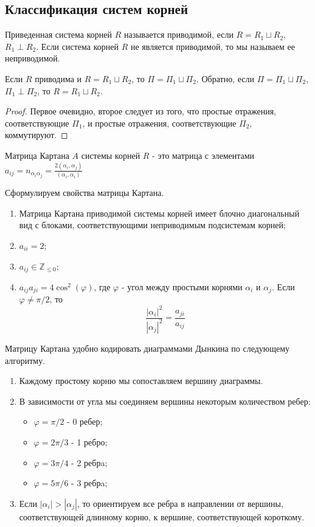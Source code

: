 \documentclass[a4article]{article}
\begin{document}
\subsection*{Классификация систем корней}
\begin{definition}
    Приведенная система корней $R$ называется приводимой, если $R=R_1 \sqcup R_2$, $R_1 \perp R_2$. Если система корней $R$ не является приводимой, то мы называем ее неприводимой.
\end{definition}
\begin{lemma}
    Если $R$ приводима и $R=R_1 \sqcup R_2$, то $\Pi=\Pi_1 \sqcup \Pi_2$. Обратно, если $\Pi=\Pi_1 \sqcup \Pi_2$, $\Pi_1 \perp \Pi_2$, то $R=R_1 \sqcup R_2$.
\end{lemma}
\begin{proof}
    Первое очевидно, второе следует из того, что простые отражения, соответствующие $\Pi_1$, и простые отражения, соответствующие $\Pi_2$, коммутируют.
\end{proof}
\begin{definition}
    Матрица Картана $A$ системы корней $R$ - это матрица с элементами $a_{ij} = n_{\alpha_i \alpha_j}=\frac{2(\alpha_i, \alpha_j)}{(\alpha_i, \alpha_i)}$
\end{definition}
\begin{lemma}
Сформулируем свойства матрицы Картана.
    \begin{enumerate}
        \item Матрица Картана приводимой системы корней имеет блочно диагональный вид с блоками, соответствующими неприводимым подсистемам корней;
        \item $a_{ii}=2$;
        \item $a_{ij} \in \mathbb{Z}_{\le 0}$;
        \item $a_{ij}a_{ji}=4\cos^2(\varphi)$, где $\varphi$ - угол между простыми корнями $\alpha_i$ и $\alpha_j$. Если $\varphi \ne \pi/2$, то
        $$\frac{|\alpha_i|^2}{|\alpha_j|^2}=\frac{a_{ji}}{a_{ij}}$$
    \end{enumerate}
\end{lemma}
Матрицу Картана удобно кодировать диаграммами Дынкина по следующему алгоритму.
\begin{enumerate}
    \item Каждому простому корню мы сопоставляем вершину диаграммы.
    \item В зависимости от угла мы соединяем вершины некоторым количеством ребер:
    \begin{itemize}
        \item $\varphi = \pi/2$ - 0 ребер;
         \item $\varphi = 2\pi/3$ - 1 ребро;
         \item $\varphi = 3\pi/4$ - 2 ребрa;
         \item $\varphi = 5\pi/6$ - 3 ребрa;
    \end{itemize}
    \item Если $|\alpha_i|>|\alpha_j|$, то ориентируем все ребра в направлении от вершины, соответствующей длинному корню, к вершине, соответствующей короткому.
\end{enumerate}
\end{document}
